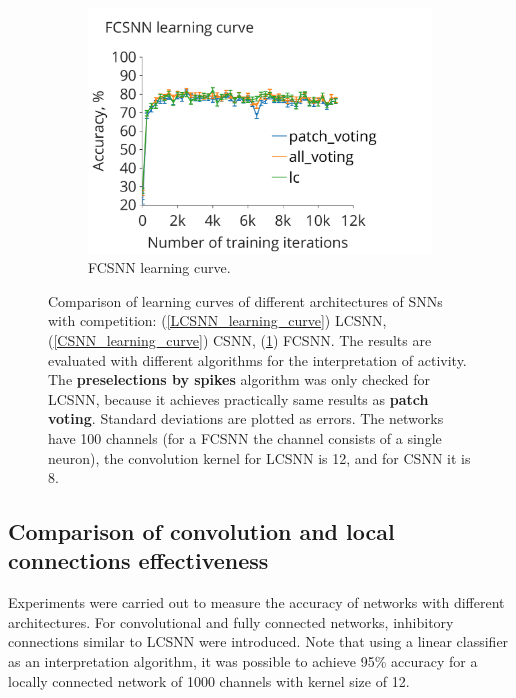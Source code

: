 \documentclass[a4paper,10pt]{article}
\begin{document}
\begin{figure}\ContinuedFloat
\begin{subfigure}{0.48\textwidth} 
    \includegraphics[width=\textwidth,keepaspectratio=true]{FCSNN_learning_rate.pdf}
 \caption{FCSNN learning curve.}
 \label{FCSNN_learning_curve}
\end{subfigure}
\caption{Comparison of learning curves of different architectures of SNNs with competition: (\ref{LCSNN_learning_curve}) LCSNN, (\ref{CSNN_learning_curve}) CSNN, (\ref{FCSNN_learning_curve}) FCSNN. The results are evaluated with different algorithms for the interpretation of activity. The \textbf{preselections by spikes} algorithm was only checked for LCSNN, because it achieves practically same results as \textbf{patch voting}. Standard deviations are plotted as errors. The networks have 100 channels (for a FCSNN the channel consists of a single neuron), the convolution kernel for LCSNN is 12, and for CSNN it is 8.}
\label{fig:learning_curves}
\end{figure}

\subsection{Comparison of convolution and local connections effectiveness}
Experiments were carried out to measure the accuracy of networks with different architectures. For convolutional and fully connected networks,  inhibitory connections similar to LCSNN were introduced. Note that using a linear classifier as an interpretation algorithm, it was possible to achieve 95\% accuracy for a locally connected network of 1000 channels with kernel size of 12.
\end{document}
